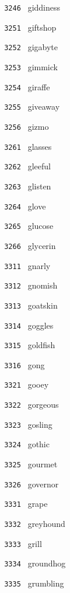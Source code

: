 \documentclass[11pt]{article}
\begin{document}
\begin{multicols}{6}
\noindent \texttt{ 3246 } giddiness  \par
\vspace{3mm}
\noindent \texttt{ 3251 } giftshop  \par
\noindent \texttt{ 3252 } gigabyte  \par
\noindent \texttt{ 3253 } gimmick  \par
\noindent \texttt{ 3254 } giraffe  \par
\noindent \texttt{ 3255 } giveaway  \par
\noindent \texttt{ 3256 } gizmo  \par
\vspace{3mm}
\noindent \texttt{ 3261 } glasses  \par
\noindent \texttt{ 3262 } gleeful  \par
\noindent \texttt{ 3263 } glisten  \par
\noindent \texttt{ 3264 } glove  \par
\noindent \texttt{ 3265 } glucose  \par
\noindent \texttt{ 3266 } glycerin  \par
\noindent \texttt{ 3311 } gnarly  \par
\noindent \texttt{ 3312 } gnomish  \par
\noindent \texttt{ 3313 } goatskin  \par
\noindent \texttt{ 3314 } goggles  \par
\noindent \texttt{ 3315 } goldfish  \par
\noindent \texttt{ 3316 } gong  \par
\vspace{3mm}
\noindent \texttt{ 3321 } gooey  \par
\noindent \texttt{ 3322 } gorgeous  \par
\noindent \texttt{ 3323 } gosling  \par
\noindent \texttt{ 3324 } gothic  \par
\noindent \texttt{ 3325 } gourmet  \par
\noindent \texttt{ 3326 } governor  \par
\vspace{3mm}
\noindent \texttt{ 3331 } grape  \par
\noindent \texttt{ 3332 } greyhound  \par
\noindent \texttt{ 3333 } grill  \par
\noindent \texttt{ 3334 } groundhog  \par
\noindent \texttt{ 3335 } grumbling  \par

\end{multicols}
\end{document}
